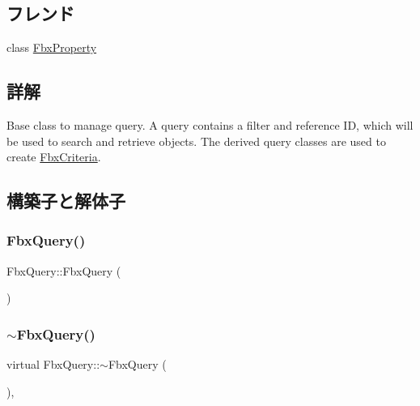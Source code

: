 \subsection*{フレンド}
\begin{DoxyCompactItemize}
\item 
class \hyperlink{class_fbx_query_a5d7018830479ec28905f28575480f88f}{Fbx\+Property}
\end{DoxyCompactItemize}


\subsection{詳解}
Base class to manage query. A query contains a filter and reference ID, which will be used to search and retrieve objects. The derived query classes are used to create \hyperlink{class_fbx_criteria}{Fbx\+Criteria}. 

\subsection{構築子と解体子}
\mbox{\label{class_fbx_query_af8e81dde9b528978812388b9dc0d6d60}} 
\subsubsection{\texorpdfstring{Fbx\+Query()}{FbxQuery()}}
{\footnotesize\ttfamily Fbx\+Query\+::\+Fbx\+Query (\begin{DoxyParamCaption}{ }\end{DoxyParamCaption})\hspace{0.3cm}{\ttfamily [protected]}}

\mbox{\label{class_fbx_query_a9e87c2a8fda32a157ed77b998aac954e}} 
\subsubsection{\texorpdfstring{$\sim$\+Fbx\+Query()}{~FbxQuery()}}
{\footnotesize\ttfamily virtual Fbx\+Query\+::$\sim$\+Fbx\+Query (\begin{DoxyParamCaption}{ }\end{DoxyParamCaption})\hspace{0.3cm}{\ttfamily [protected]}, {\ttfamily [virtual]}}



